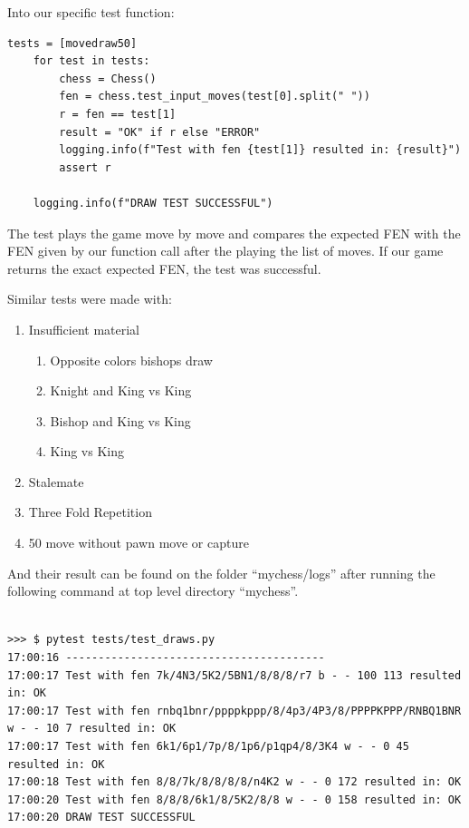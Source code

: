 \documentclass[10pt]{article}
\begin{document}
Into our specific test function:

\begin{lstlisting}
tests = [movedraw50]
    for test in tests:
        chess = Chess()
        fen = chess.test_input_moves(test[0].split(" "))
        r = fen == test[1]
        result = "OK" if r else "ERROR"
        logging.info(f"Test with fen {test[1]} resulted in: {result}")
        assert r

    logging.info(f"DRAW TEST SUCCESSFUL")

\end{lstlisting}

The test plays the game move by move and compares the expected FEN with the FEN
given by our function call after the playing the list of moves. If our game returns the
exact expected FEN, the test was successful.

Similar tests were made with:
\begin{enumerate}[label=\arabic*)]
\item Insufficient material
    \begin{enumerate}[label=\arabic{enumii}.\arabic*)]
    \item Opposite colors bishops draw
    \item Knight and King vs King
    \item Bishop and King vs King
    \item King vs King
    \end{enumerate}
    
    \item Stalemate 
    \item Three Fold Repetition
    \item 50 move without pawn move or capture
\end{enumerate}

And their result can be found on the folder ``mychess/logs'' after running the
following command at top level directory ``mychess''.
\begin{lstlisting}

>>> $ pytest tests/test_draws.py
17:00:16 ----------------------------------------
17:00:17 Test with fen 7k/4N3/5K2/5BN1/8/8/8/r7 b - - 100 113 resulted in: OK
17:00:17 Test with fen rnbq1bnr/ppppkppp/8/4p3/4P3/8/PPPPKPPP/RNBQ1BNR w - - 10 7 resulted in: OK
17:00:17 Test with fen 6k1/6p1/7p/8/1p6/p1qp4/8/3K4 w - - 0 45 resulted in: OK
17:00:18 Test with fen 8/8/7k/8/8/8/8/n4K2 w - - 0 172 resulted in: OK
17:00:20 Test with fen 8/8/8/6k1/8/5K2/8/8 w - - 0 158 resulted in: OK
17:00:20 DRAW TEST SUCCESSFUL

\end{lstlisting}
\end{document}
